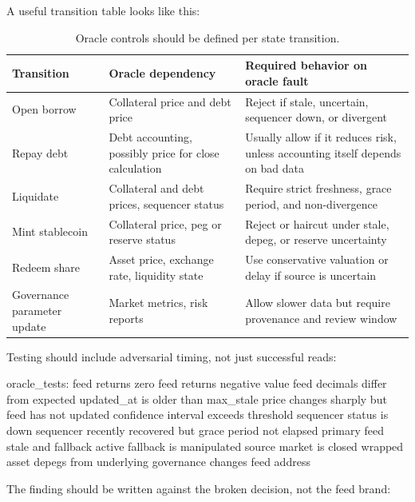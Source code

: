 A useful transition table looks like this:

\begin{table}[htbp]
\centering
\small
\renewcommand{\arraystretch}{1.16}
\begin{tabularx}{\textwidth}{@{}>{\RaggedRight\arraybackslash}p{}>{\RaggedRight\arraybackslash}p{}>{\RaggedRight\arraybackslash}X@{}}
\toprule
Transition & Oracle dependency & Required behavior on oracle fault \\
\midrule
Open borrow & Collateral price and debt price & Reject if stale, uncertain, sequencer down, or divergent \\
Repay debt & Debt accounting, possibly price for close calculation & Usually allow if it reduces risk, unless accounting itself depends on bad data \\
Liquidate & Collateral and debt prices, sequencer status & Require strict freshness, grace period, and non-divergence \\
Mint stablecoin & Collateral price, peg or reserve status & Reject or haircut under stale, depeg, or reserve uncertainty \\
Redeem share & Asset price, exchange rate, liquidity state & Use conservative valuation or delay if source is uncertain \\
Governance parameter update & Market metrics, risk reports & Allow slower data but require provenance and review window \\
\bottomrule
\end{tabularx}
\caption{Oracle controls should be defined per state transition.}
\end{table}

Testing should include adversarial timing, not just successful reads:

\begin{codeblock}
oracle_tests:
    feed returns zero
    feed returns negative value
    feed decimals differ from expected
    updated_at is older than max_stale
    price changes sharply but feed has not updated
    confidence interval exceeds threshold
    sequencer status is down
    sequencer recently recovered but grace period not elapsed
    primary feed stale and fallback active
    fallback is manipulated
    source market is closed
    wrapped asset depegs from underlying
    governance changes feed address
\end{codeblock}

The finding should be written against the broken decision, not the feed brand:

